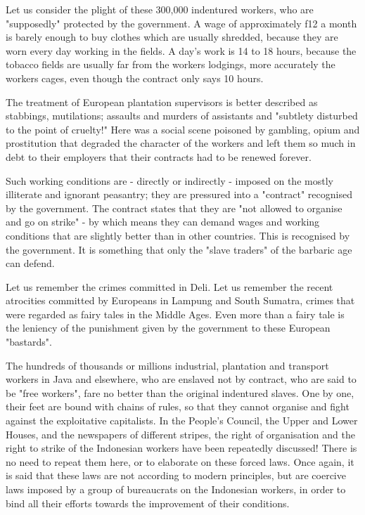 Let us consider the plight of these 300,000 indentured workers, 
who are "supposedly" protected by the government. A wage of approximately f12 a 
month is barely enough to buy clothes which are usually shredded, because they 
are worn every day working in the fields. A day's work is 14 to 18 hours, because 
the tobacco fields are usually far from the workers lodgings, more accurately the 
workers cages, even though the contract only says 10 hours.\vskip 0.2in

The treatment of European plantation supervisors is better described as stabbings, mutilations; 
assaults and murders of assistants and "subtlety disturbed to the point of cruelty!" 
Here was a social scene poisoned by gambling, opium and prostitution that degraded 
the character of the workers and left them so much in debt to their employers that their contracts had to be renewed forever.\vskip 0.2in

Such working conditions are - directly or indirectly - imposed on the mostly 
illiterate and ignorant peasantry; they are pressured into a "contract" recognised 
by the government. The contract states that they are "not allowed to organise and 
go on strike" - by which means they can demand wages and working conditions that are 
slightly better than in other countries. This is recognised by the government. 
It is something that only the "slave traders" of the barbaric age can defend.\vskip 0.2in

Let us remember the crimes committed in Deli. Let us remember the recent atrocities 
committed by Europeans in Lampung and South Sumatra, crimes that were regarded as fairy 
tales in the Middle Ages. Even more than a fairy tale is the leniency of the punishment 
given by the government to these European "bastards".\vskip 0.2in

The hundreds of thousands or millions industrial, plantation and 
transport workers in Java and elsewhere, who are enslaved not by contract, 
who are said to be "free workers", fare no better than the original indentured 
slaves. One by one, their feet are bound with chains of rules, so that they 
cannot organise and fight against the exploitative capitalists. In the People's 
Council, the Upper and Lower Houses, and the newspapers of different stripes, 
the right of organisation and the right to strike of the Indonesian workers have 
been repeatedly discussed! There is no need to repeat them here, or to elaborate 
on these forced laws. Once again, it is said that these laws are not according to 
modern principles, but are coercive laws imposed by a group of bureaucrats on 
the Indonesian workers, in order to bind all their efforts towards the improvement of their conditions.\vskip 0.2in

